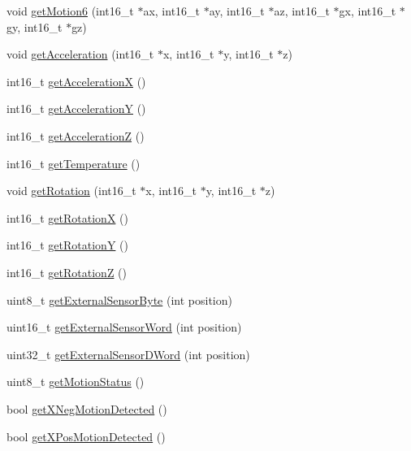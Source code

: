 \begin{DoxyCompactItemize}
\item 
void \mbox{\hyperlink{classMPU6050_a574d3093dc131e4251a9b37adf208ca7}{get\+Motion6}} (int16\+\_\+t $\ast$ax, int16\+\_\+t $\ast$ay, int16\+\_\+t $\ast$az, int16\+\_\+t $\ast$gx, int16\+\_\+t $\ast$gy, int16\+\_\+t $\ast$gz)
\item 
void \mbox{\hyperlink{classMPU6050_a658dfc7e35b7fdba360a75f137bde33a}{get\+Acceleration}} (int16\+\_\+t $\ast$x, int16\+\_\+t $\ast$y, int16\+\_\+t $\ast$z)
\item 
int16\+\_\+t \mbox{\hyperlink{classMPU6050_aa68475158c22128e5459c4c5e19439dc}{get\+AccelerationX}} ()
\item 
int16\+\_\+t \mbox{\hyperlink{classMPU6050_a27240b90d3e03c85b7a619b794bb1756}{get\+AccelerationY}} ()
\item 
int16\+\_\+t \mbox{\hyperlink{classMPU6050_acf5f5a20c10d99a1bdedf139f897bfdf}{get\+AccelerationZ}} ()
\item 
int16\+\_\+t \mbox{\hyperlink{classMPU6050_aedfa4f1e6507f48c0a09545345a87875}{get\+Temperature}} ()
\item 
void \mbox{\hyperlink{classMPU6050_a8ca85b87e7e0230921062fce7889b0d1}{get\+Rotation}} (int16\+\_\+t $\ast$x, int16\+\_\+t $\ast$y, int16\+\_\+t $\ast$z)
\item 
int16\+\_\+t \mbox{\hyperlink{classMPU6050_a268f52843a24992ff06a3f12392de584}{get\+RotationX}} ()
\item 
int16\+\_\+t \mbox{\hyperlink{classMPU6050_a97cbe7f10dd27e07bd78d1c25e4286b5}{get\+RotationY}} ()
\item 
int16\+\_\+t \mbox{\hyperlink{classMPU6050_ae0fee1ba996a2b6f914df6fc34e7da48}{get\+RotationZ}} ()
\item 
uint8\+\_\+t \mbox{\hyperlink{classMPU6050_a7f786ab4264f40e5a95e8937ec9adcc2}{get\+External\+Sensor\+Byte}} (int position)
\item 
uint16\+\_\+t \mbox{\hyperlink{classMPU6050_aaee15e48af7ba78660b5754f3bb5f37a}{get\+External\+Sensor\+Word}} (int position)
\item 
uint32\+\_\+t \mbox{\hyperlink{classMPU6050_afd8983f0911e37015434bebc85185fb2}{get\+External\+Sensor\+D\+Word}} (int position)
\item 
uint8\+\_\+t \mbox{\hyperlink{classMPU6050_af6e4fd231a9db99bd4270cf640eeae46}{get\+Motion\+Status}} ()
\item 
bool \mbox{\hyperlink{classMPU6050_a446d235905783c5b90637a6b6792ac76}{get\+X\+Neg\+Motion\+Detected}} ()
\item 
bool \mbox{\hyperlink{classMPU6050_a410af58f5ff5f74e4ef8d61495908226}{get\+X\+Pos\+Motion\+Detected}} ()

\end{DoxyCompactItemize}
